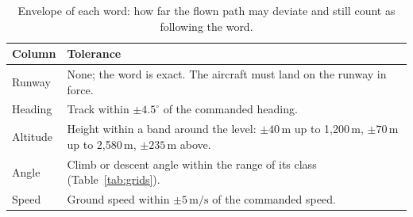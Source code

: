 \begin{table}[t]
\centering
\caption{Envelope of each word: how far the flown path may deviate and still count as following the word.}
\label{tab:envelopes}
\small
\renewcommand{\arraystretch}{1.25}
\begin{tabularx}{\textwidth}{@{}l >{\raggedright\arraybackslash}X@{}}
\toprule
Column & Tolerance \\
\midrule
Runway   & None; the word is exact. The aircraft must land on the runway in force. \\
Heading  & Track within $\pm 4.5^\circ$ of the commanded heading. \\
Altitude & Height within a band around the level: $\pm 40$\,m up to 1,200\,m, $\pm 70$\,m up to 2,580\,m, $\pm 235$\,m above. \\
Angle    & Climb or descent angle within the range of its class (Table~\ref{tab:grids}). \\
Speed    & Ground speed within $\pm 5\,\mathrm{m/s}$ of the commanded speed. \\
\bottomrule
\end{tabularx}
\end{table}
